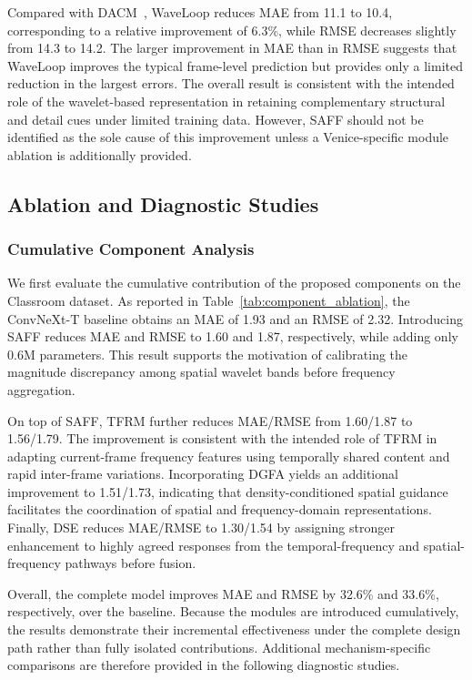 \documentclass[lettersize,journal]{IEEEtran}
\begin{document}
Compared with DACM~\cite{ling2025dual}, WaveLoop reduces MAE from 11.1 to 10.4, corresponding to a relative improvement of 6.3\%, while RMSE decreases slightly from 14.3 to 14.2. The larger improvement in MAE than in RMSE suggests that WaveLoop improves the typical frame-level prediction but provides only a limited reduction in the largest errors. The overall result is consistent with the intended role of the wavelet-based representation in retaining complementary structural and detail cues under limited training data. However, SAFF should not be identified as the sole cause of this improvement unless a Venice-specific module ablation is additionally provided.

\subsection{Ablation and Diagnostic Studies}
\label{sec:ablation}

\subsubsection{Cumulative Component Analysis}
We first evaluate the cumulative contribution of the proposed components on the Classroom dataset. As reported in Table~\ref{tab:component_ablation}, the ConvNeXt-T baseline obtains an MAE of 1.93 and an RMSE of 2.32. Introducing SAFF reduces MAE and RMSE to 1.60 and 1.87, respectively, while adding only 0.6M parameters. This result supports the motivation of calibrating the magnitude discrepancy among spatial wavelet bands before frequency aggregation.

On top of SAFF, TFRM further reduces MAE/RMSE from 1.60/1.87 to 1.56/1.79. The improvement is consistent with the intended role of TFRM in adapting current-frame frequency features using temporally shared content and rapid inter-frame variations. Incorporating DGFA yields an additional improvement to 1.51/1.73, indicating that density-conditioned spatial guidance facilitates the coordination of spatial and frequency-domain representations. Finally, DSE reduces MAE/RMSE to 1.30/1.54 by assigning stronger enhancement to highly agreed responses from the temporal-frequency and spatial-frequency pathways before fusion.

Overall, the complete model improves MAE and RMSE by 32.6\% and 33.6\%, respectively, over the baseline. Because the modules are introduced cumulatively, the results demonstrate their incremental effectiveness under the complete design path rather than fully isolated contributions. Additional mechanism-specific comparisons are therefore provided in the following diagnostic studies.
\end{document}
